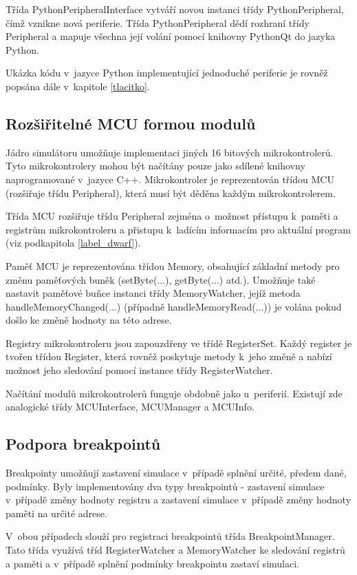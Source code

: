 Třída PythonPeripheralInterface vytváří novou instanci třídy PythonPeripheral, čímž vznikne nová periferie. Třída PythonPeripheral dědí rozhraní třídy Peripheral a mapuje všechna její volání pomocí knihovny PythonQt do jazyka Python.

Ukázka kódu v~jazyce Python implementující jednoduché periferie je rovněž popsána dále v~kapitole \ref{tlacitko}.

\subsection{Rozšiřitelné MCU formou modulů}

Jádro simulátoru umožňuje implementaci jiných 16 bitových mikrokontrolerů. Tyto mikrokontrolery mohou být načítány pouze jako sdílené knihovny naprogramované v~jazyce C++. Mikrokontroler je reprezentován třídou MCU (rozšiřuje třídu Peripheral), která musí být děděna každým mikrokontrolerem.

Třída MCU rozšiřuje třídu Peripheral zejména o~možnost přístupu k~paměti a registrům mikrokontroleru a přistupu k~ladícím informacím pro aktuální program (viz podkapitola \ref{label_dwarf}).

Paměť MCU je reprezentována třídou Memory, obsahující základní metody pro změnu paměťových buněk (setByte(...), getByte(...) atd.). Umožňuje také nastavit paměťové buňce instanci třídy MemoryWatcher, jejíž metoda handleMemoryChanged(...) (případně handleMemoryRead(...)) je volána pokud došlo ke změně hodnoty na této adrese.

Registry mikrokontroleru jsou zapouzdřeny ve třídě RegisterSet. Každý register je tvořen třídou Register, která rovněž poskytuje metody k~jeho změně a nabízí možnost jeho sledování pomocí instance třídy RegisterWatcher.

Načítání modulů mikrokontrolerů funguje obdobně jako u~periferií. Existují zde analogické třídy MCUInterface, MCUManager a MCUInfo.

\subsection{Podpora breakpointů}

Breakpointy umožňují zastavení simulace v~případě splnění určité, předem dané, podmínky. Byly implementovány dva typy breakpointů - zastavení simulace v~případě změny hodnoty registru a zastavení simulace v~případě změny hodnoty paměti na určité adrese.

V~obou případech slouží pro registraci breakpointů třída BreakpointManager. Tato třída využívá tříd RegisterWatcher a MemoryWatcher ke sledování registrů a paměti a v~případě splnění podmínky breakpointu zastaví simulaci.


